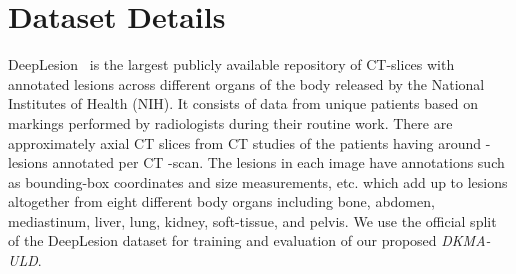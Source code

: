 \documentclass{bmvc2k}
\begin{document}
\begin{comment}
\begin{itemize}
    \item intensity windows : explain with diagram
    \item lesion specific anchors - 1)  comparison diagram with 3DCE and improved RetinaNet (at FPs4 <10mm, 10-30, >30mm) ; old anchor and new anchor results. 2) anchor diagram on one single image to show the diff.
    \item attention module ; extra diag 
    \item Self supervision ; theory for contrastive learning / BYOL 
    \item FCOS mining - teacher model ? works for other datasets also.
    \item final result table - ResNeXt152 , w/ new window and anchor-84.8 , w/ self supervision-85.37 , w/ fcos-86.35
    
    \item supplementary : ablation study for fcos
                     anchors sizes
                     windows : 3 and 5
                     baseline resnext101, 152, w/o attention(avg pool), w/ attention 
\end{itemize}
\\
\end{comment}


\section{Dataset Details}
\label{sec:dataset}
\vspace{-2mm}
DeepLesion~\cite{yan2018deeplesion} is the largest publicly available repository of CT-slices with annotated lesions across different organs of the body released by the National Institutes of Health (NIH). It consists of data from  unique patients based on markings performed by radiologists during their routine work. There are approximately  axial CT slices from  CT studies of the patients having around - lesions annotated per CT -scan. The lesions in each image have annotations such as bounding-box coordinates and size measurements, etc. which add up to  lesions altogether from eight different body organs including bone, abdomen, mediastinum, liver, lung, kidney, soft-tissue, and pelvis. We use the official split of the DeepLesion dataset for training and evaluation of our proposed \emph{DKMA-ULD}.

\vspace{-2mm}
\end{document}
